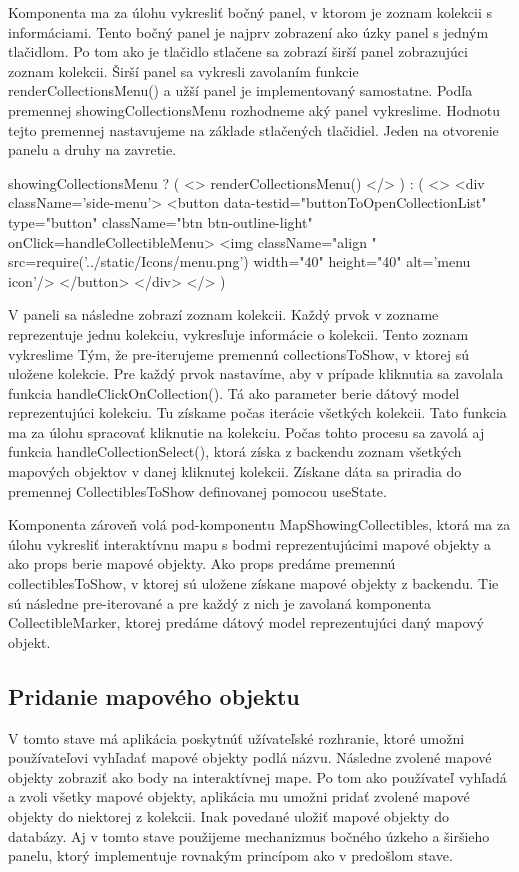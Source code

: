 Komponenta ma za úlohu vykresliť bočný panel, v ktorom je zoznam kolekcii s informáciami. Tento bočný panel je najprv zobrazení ako úzky panel s jedným tlačidlom. Po tom ako je tlačidlo  
stlačene sa zobrazí širší panel zobrazujúci zoznam kolekcii. Širší panel sa vykresli zavolaním funkcie renderCollectionsMenu() a užší panel je implementovaný samostatne. 
Podľa premennej showingCollectionsMenu rozhodneme aký panel vykreslime. Hodnotu tejto premennej nastavujeme na základe stlačených tlačidiel. Jeden na otvorenie panelu a druhy na zavretie. 
\begin{code}
{showingCollectionsMenu ? (
      <>
      {renderCollectionsMenu()}
      </>
      ) : (
      <>
            <div className='side-menu'>
                  <button data-testid="buttonToOpenCollectionList" type="button" className="btn btn-outline-light" onClick={handleCollectibleMenu}>
                        <img className="align " src={require('../static/Icons/menu.png')} width="40" height="40" alt='menu icon'/>
                  </button>
            </div>
      </>
)}
\end{code}
V paneli sa následne zobrazí zoznam kolekcii. Každý prvok v zozname reprezentuje jednu kolekciu, vykresľuje informácie o kolekcii. Tento zoznam vykreslime  
Tým, že pre-iterujeme premennú collectionsToShow, v ktorej sú uložene kolekcie. Pre každý prvok nastavíme, aby v prípade kliknutia sa zavolala funkcia handleClickOnCollection(). Tá ako parameter berie 
dátový model reprezentujúci kolekciu. Tu získame počas iterácie všetkých kolekcii. Tato funkcia ma za úlohu spracovať kliknutie na kolekciu. Počas tohto procesu sa zavolá aj funkcia handleCollectionSelect(), 
ktorá získa z backendu zoznam všetkých mapových objektov v danej kliknutej kolekcii. Získane dáta sa priradia do premennej CollectiblesToShow definovanej pomocou useState. 

Komponenta zároveň volá pod-komponentu MapShowingCollectibles, ktorá ma za úlohu vykresliť interaktívnu mapu s bodmi reprezentujúcimi mapové objekty a ako props berie mapové objekty. 
Ako props predáme premennú collectiblesToShow, v ktorej sú uložene získane mapové objekty z backendu. Tie sú následne pre-iterované a pre každý z nich  je zavolaná komponenta CollectibleMarker, ktorej predáme dátový model reprezentujúci daný mapový objekt. 

\subsection*{Pridanie mapového objektu }
V tomto stave má aplikácia poskytnúť užívateľské rozhranie, ktoré umožni používateľovi vyhľadať mapové objekty podlá názvu. Následne zvolené mapové objekty zobraziť ako body na  
interaktívnej mape. Po tom ako používateľ vyhľadá a zvoli všetky mapové objekty, aplikácia mu umožni pridať zvolené mapové objekty do niektorej z kolekcii. Inak povedané uložiť mapové objekty do databázy. 
Aj v tomto stave použijeme mechanizmus bočného úzkeho a širšieho panelu, ktorý implementuje rovnakým princípom ako v predošlom stave. 

